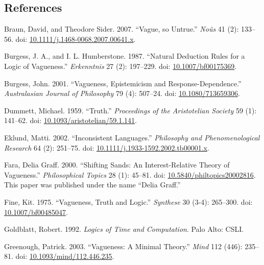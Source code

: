\documentclass[
  11pt,
  letterpaper,
  DIV=11,
  numbers=noendperiod,
  twoside]{scrartcl}
\newlength{\cslhangindent}
\newenvironment{CSLReferences}[2] %
 {\begin{list}{}{%
  \setlength{\itemindent}{0pt}
  \setlength{\leftmargin}{0pt}
  \setlength{\parsep}{0pt}
  \ifodd #1
   \setlength{\leftmargin}{\cslhangindent}
   \setlength{\itemindent}{-1\cslhangindent}
  \fi
  \setlength{\itemsep}{#2\baselineskip}}}
 {\end{list}}
\begin{document}
\subsection*{References}\label{references}

\label{refs}
\begin{CSLReferences}{1}{0}
Braun, David, and Theodore Sider. 2007. {``Vague, so Untrue.''}
\emph{No{û}s} 41 (2): 133--56. doi:
\href{https://doi.org/10.1111/j.1468-0068.2007.00641.x}{10.1111/j.1468-0068.2007.00641.x}.

Burgess, J. A., and I. L. Humberstone. 1987. {``Natural Deduction Rules
for a Logic of Vagueness.''} \emph{Erkenntnis} 27 (2): 197--229. doi:
\href{https://doi.org/10.1007/bf00175369}{10.1007/bf00175369}.

Burgess, John. 2001. {``Vagueness, Epistemicism and
Response-Dependence.''} \emph{Australasian Journal of Philosophy} 79
(4): 507--24. doi:
\href{https://doi.org/10.1080/713659306}{10.1080/713659306}.

Dummett, Michael. 1959. {``Truth.''} \emph{Proceedings of the
Aristotelian Society} 59 (1): 141--62. doi:
\href{https://doi.org/10.1093/aristotelian/59.1.141}{10.1093/aristotelian/59.1.141}.

Eklund, Matti. 2002. {``Inconsistent Languages.''} \emph{Philosophy and
Phenomenological Research} 64 (2): 251--75. doi:
\href{https://doi.org/10.1111/j.1933-1592.2002.tb00001.x}{10.1111/j.1933-1592.2002.tb00001.x}.

Fara, Delia Graff. 2000. {``Shifting Sands: An Interest-Relative Theory
of Vagueness.''} \emph{Philosophical Topics} 28 (1): 45--81. doi:
\href{https://doi.org/10.5840/philtopics20002816}{10.5840/philtopics20002816}.
This paper was published under the name {``Delia Graff.''}

Fine, Kit. 1975. {``Vagueness, Truth and Logic.''} \emph{Synthese} 30
(3-4): 265--300. doi:
\href{https://doi.org/10.1007/bf00485047}{10.1007/bf00485047}.

Goldblatt, Robert. 1992. \emph{Logics of Time and Computation}. Palo
Alto: CSLI.

Greenough, Patrick. 2003. {``Vagueness: A Minimal Theory.''} \emph{Mind}
112 (446): 235--81. doi:
\href{https://doi.org/10.1093/mind/112.446.235}{10.1093/mind/112.446.235}.


\end{CSLReferences}
\end{document}
